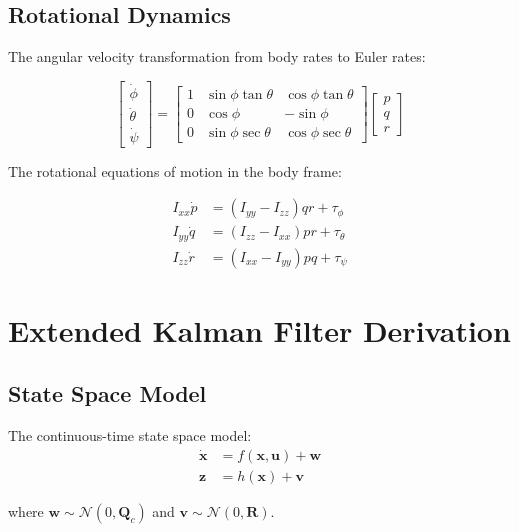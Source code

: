 \subsection{Rotational Dynamics}

The angular velocity transformation from body rates to Euler rates:

\begin{equation}
    \begin{bmatrix} \dot{\phi} \\ \dot{\theta} \\ \dot{\psi} \end{bmatrix} =
    \begin{bmatrix}
        1 & \sin\phi\tan\theta & \cos\phi\tan\theta \\
        0 & \cos\phi & -\sin\phi \\
        0 & \sin\phi\sec\theta & \cos\phi\sec\theta
    \end{bmatrix}
    \begin{bmatrix} p \\ q \\ r \end{bmatrix}
\end{equation}

The rotational equations of motion in the body frame:

\begin{align}
    I_{xx}\dot{p} &= (I_{yy} - I_{zz})qr + \tau_\phi \\
    I_{yy}\dot{q} &= (I_{zz} - I_{xx})pr + \tau_\theta \\
    I_{zz}\dot{r} &= (I_{xx} - I_{yy})pq + \tau_\psi
\end{align}

\section{Extended Kalman Filter Derivation}

\subsection{State Space Model}

The continuous-time state space model:
\begin{align}
    \dot{\mathbf{x}} &= f(\mathbf{x}, \mathbf{u}) + \mathbf{w} \\
    \mathbf{z} &= h(\mathbf{x}) + \mathbf{v}
\end{align}

where $\mathbf{w} \sim \mathcal{N}(0, \mathbf{Q}_c)$ and $\mathbf{v} \sim \mathcal{N}(0, \mathbf{R})$.

